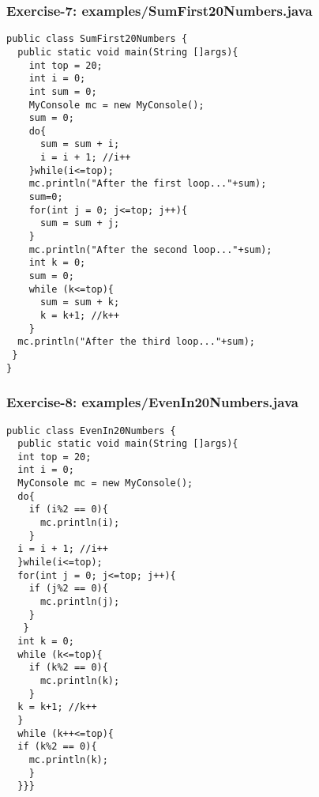 \documentclass[xcolor=dvipsnames,dvip,notes=show,table]{beamer}
\begin{document}


\begin{frame}[fragile]
\frametitle{Exercise-7: examples/SumFirst20Numbers.java}
\tiny
\begin{lstlisting}
public class SumFirst20Numbers {
  public static void main(String []args){
    int top = 20;
    int i = 0;
    int sum = 0;
    MyConsole mc = new MyConsole();
    sum = 0;
    do{
      sum = sum + i;
      i = i + 1; //i++
    }while(i<=top);		
    mc.println("After the first loop..."+sum);
    sum=0;
    for(int j = 0; j<=top; j++){
      sum = sum + j;
    }
    mc.println("After the second loop..."+sum);
    int k = 0;
    sum = 0;
    while (k<=top){
      sum = sum + k;
      k = k+1; //k++
    }
  mc.println("After the third loop..."+sum);
 }
}
\end{lstlisting}
\end{frame}




\begin{frame}[fragile]
\frametitle{Exercise-8: examples/EvenIn20Numbers.java}
\tiny
\begin{lstlisting}
public class EvenIn20Numbers {
  public static void main(String []args){
  int top = 20;
  int i = 0;
  MyConsole mc = new MyConsole();
  do{
    if (i%2 == 0){
      mc.println(i);
    }
  i = i + 1; //i++
  }while(i<=top);		
  for(int j = 0; j<=top; j++){
    if (j%2 == 0){
      mc.println(j);
    }
   }
  int k = 0;
  while (k<=top){
    if (k%2 == 0){
      mc.println(k);
    }
  k = k+1; //k++
  }
  while (k++<=top){
  if (k%2 == 0){
    mc.println(k);
    }
  }}}
\end{lstlisting}
\end{frame}



\end{document}
